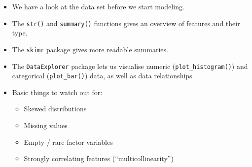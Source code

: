 \documentclass[]{article}
\providecommand{\tightlist}{%
  \setlength{\itemsep}{0pt}\setlength{\parskip}{0pt}}
\begin{document}
\begin{itemize}
\tightlist
\item
  We have a look at the data set before we start modeling.
\item
  The \texttt{str()} and \texttt{summary()} functions gives an overview
  of features and their type.
\item
  The \texttt{skimr} package gives more readable summaries.
\item
  The \texttt{DataExplorer} package lets us visualise numeric
  (\texttt{plot\_histogram()}) and categorical (\texttt{plot\_bar()})
  data, as well as data relationships.
\item
  Basic things to watch out for:

  \begin{itemize}
  \tightlist
  \item
    Skewed distributions
  \item
    Missing values
  \item
    Empty / rare factor variables
  \item
    Strongly correlating features (``multicollinearity'')
  \end{itemize}
\end{itemize}
\end{document}
